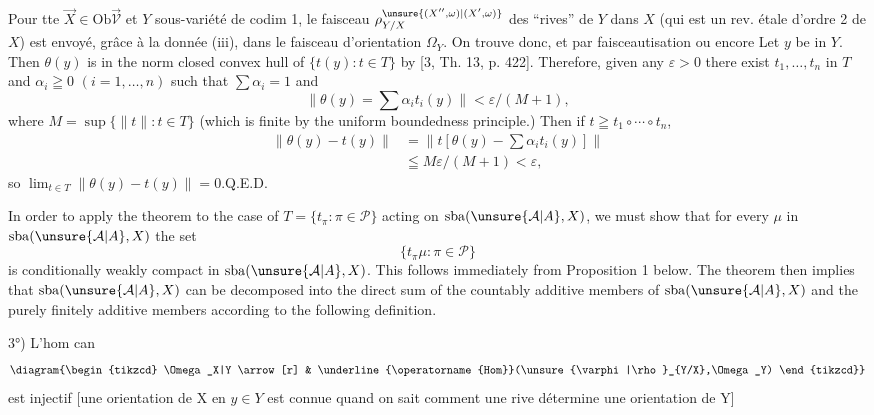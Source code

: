  Pour tte $\vec X\in\mathrm{Ob}\vec{\mathcal V}$ et $Y$ sous-variété de codim 1, le faisceau $\rho_{Y/X}^{\unsure{(X'',\omega)|(X',\omega)}}$ des ``rives'' de $Y$ dans $X$ (qui est un rev. étale d'ordre 2 de $X$) est envoyé, grâce à la donnée (iii), dans le faisceau d'orientation $\Omega_Y$. On trouve donc, 
et par faisceautisation
ou encore
Let $y$ be in $Y$. Then $\theta(y)$ is in the norm closed convex hull of $\{t(y):t\in T\}$ by [3, Th. 13, p. 422]. Therefore, given any $\varepsilon>0$ there exist $t_1,\ldots,t_n$ in $T$ and $\alpha_i\geqq0$ $(i=1,\ldots,n)$ such that $\sum\alpha_i=1$ and
\[
\|\theta(y)=\sum\alpha_it_i(y)\|<\varepsilon/(M+1),
\]
where $M=\sup\{\|t\|:t\in T\}$ (which is finite by the uniform boundedness principle.) Then if $t\geqq t_1\circ\cdots\circ t_n$,
\[
\begin{aligned}
\|\theta(y)-t(y)\|&=\|t[\theta(y)-\sum\alpha_it_i(y)]\|\\
&\leqq M\varepsilon/(M+1)<\varepsilon,
\end{aligned}
\]
so $\lim_{t\in T}\|\theta(y)-t(y)\|=0$.\hfill Q.E.D.

In order to apply the theorem to the case of $T=\{t_\pi:\pi\in\mathcal P\}$ acting on $\mathrm{sba}(\unsure{\mathcal A|A},X)$, we must show that for every $\mu$ in $\mathrm{sba}(\unsure{\mathcal A|A},X)$ the set
\[
\{t_\pi\mu:\pi\in\mathcal P\}
\]
is conditionally weakly compact in $\mathrm{sba}(\unsure{\mathcal A|A},X)$. This follows immediately from Proposition 1 below. The theorem then implies that $\mathrm{sba}(\unsure{\mathcal A|A},X)$ can be decomposed into the direct sum of the countably additive members of $\mathrm{sba}(\unsure{\mathcal A|A},X)$ and the purely finitely additive members according to the following definition.

3°) L'hom can
\[
\diagram{\begin{tikzcd}
\Omega_X|Y \arrow[r] & \underline{\operatorname{Hom}}(\unsure{\varphi|\rho}_{Y/X},\Omega_Y)
\end{tikzcd}}
\]
est injectif [une orientation de X en $y\in Y$ est connue quand on sait comment  une rive  détermine une orientation de Y]

